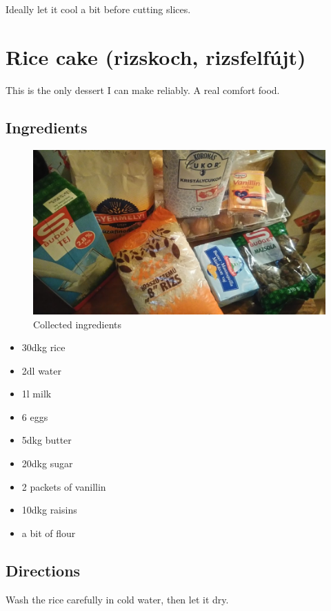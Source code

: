 \documentclass{article}
\begin{document}
Ideally let it cool a bit before cutting slices.

\newpage
\section{Rice cake (rizskoch, rizsfelfújt)}

This is the only dessert I can make reliably. A real comfort food.

\subsection{Ingredients}

\begin{figure}[!htbp]
\includegraphics[width=\textwidth]{rizskoch_01}
\caption{Collected ingredients}
\end{figure}

\begin{itemize}
    \item 30dkg rice
    \item 2dl water
    \item 1l milk
    \item 6 eggs
    \item 5dkg butter
    \item 20dkg sugar
    \item 2 packets of vanillin
    \item 10dkg raisins
    \item a bit of flour
\end{itemize}

\subsection{Directions}

Wash the rice carefully in cold water, then let it dry.
\end{document}
